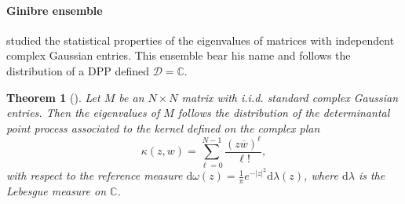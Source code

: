 \documentclass[twoside,11pt]{book}
\newtheorem{theorem}{Theorem}
\numberwithin{theorem}{chapter}
\numberwithin{definition}{chapter}
\numberwithin{proposition}{chapter}
\numberwithin{corollary}{chapter}
\numberwithin{example}{chapter}
\numberwithin{lemma}{chapter}
\numberwithin{assumption}{chapter}
\numberwithin{equation}{chapter}
\numberwithin{figure}{chapter}
\begin{document}







\paragraph{Ginibre ensemble}
\cite{Gin65} studied the statistical properties of the eigenvalues of matrices with independent complex Gaussian entries. This ensemble bear his name and follows the distribution of a DPP defined $\mathcal{D} = \mathbb{C}$.
\begin{theorem}[\cite{Gin65}]
Let $M$ be an $N\times N$ matrix with i.i.d. standard complex Gaussian entries.
Then the eigenvalues of $M$ follows the distribution of the determinantal point
process associated to the kernel defined on the complex plan
\begin{equation}
\kappa(z,w) = \sum\limits_{\ell =0}^{N-1} \frac{(z \overline{w})^{\ell}}{\ell!},
\end{equation}
with respect to the reference measure $\mathrm{d}\omega(z) = \frac{1}{\pi}e^{-|z|^{2}} \mathrm{d}\lambda(z)$, where $\mathrm{d}\lambda$ is the Lebesgue measure on $\mathbb{C}$.
\end{theorem}
\end{document}
